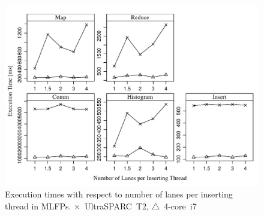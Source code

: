 \documentclass[runningheads,a4paper,fleqn]{llncs}
\begin{document}
\begin{figure}
  \includegraphics[width=\textwidth]{../../benchmarks/graphs/lanef-scaling}
  \caption{Execution times with respect to number of lanes per
    inserting thread in MLFPs. $\times$~UltraSPARC~T2,
    $\triangle$~4-core~i7}
  \label{fig:lanef-scaling}
\end{figure}
\end{document}
